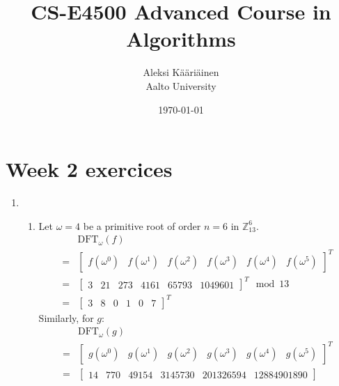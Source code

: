 \documentclass[11pt,a4paper]{article}
\title{CS-E4500 Advanced Course in Algorithms}
\author{Aleksi Kääriäinen  \\
	Aalto University  \\
	}
\begin{document}
\date{\today}

\maketitle

\newpage

\section*{Week 2 exercices}

\begin{enumerate}
    \item \begin{enumerate}
              \item Let $\omega = 4$ be a primitive root of order $n = 6$ in $\mathbb{Z}_{13}^6$.
                    \begin{align*}
                        & \text{DFT}_\omega(f)                      \\ = & \begin{bmatrix}
                            f(\omega^0) & f(\omega^1) & f(\omega^2) & f(\omega^3) & f(\omega^4) & f(\omega^5)
                        \end{bmatrix}^T \\
                        = & \begin{bmatrix}
                                3 & 21 & 273 & 4161 & 65793 & 1049601
                            \end{bmatrix}^T \mod{13} \\
                        = & \begin{bmatrix}
                                3 & 8 & 0 & 1 & 0 & 7
                            \end{bmatrix}^T
                    \end{align*}
                    Similarly, for $g$:
                    \begin{align*}
                          & \text{DFT}_\omega(g)                                 \\ = & \begin{bmatrix}
                            g(\omega^0) & g(\omega^1) & g(\omega^2) & g(\omega^3) & g(\omega^4) & g(\omega^5)
                        \end{bmatrix}^T \\
                        = & \begin{bmatrix}
                                14 & 770 & 49154 & 3145730 & 201326594 & 12884901890

\end{bmatrix}
\end{align*}
\end{enumerate}
\end{enumerate}
\end{document}

